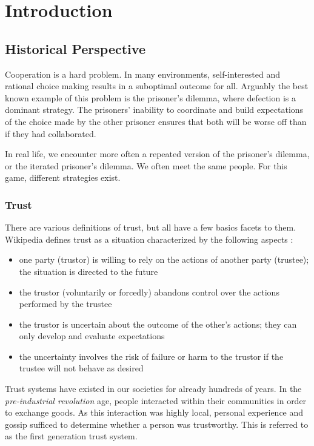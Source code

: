 \chapter{Introduction}
\section{Historical Perspective}
Cooperation is a hard problem. 
In many environments, self-interested and rational choice making results in a suboptimal outcome for all. 
Arguably the best known example of this problem is the prisoner's dilemma, 
where defection is a dominant strategy. 
The prisoners' inability to coordinate and build expectations of the choice made by the other prisoner ensures that both will be worse off than if they had collaborated.

In real life, we encounter more often a repeated version of the prisoner's dilemma, or the iterated prisoner's dilemma. 
We often meet the same people. 
For this game, different strategies exist. 

\subsection{Trust}
There are various definitions of trust, 
but all have a few basics facets to them. 
Wikipedia defines trust as a situation characterized by the following aspects \cite{wikipedia_trust}:
\begin{itemize}
	\item one party (trustor) is willing to rely on the actions of another party (trustee); 
	the situation is directed to the future
	\item the trustor (voluntarily or forcedly) abandons control over the actions performed by the trustee
	\item the trustor is uncertain about the outcome of the other's actions; 
	they can only develop and evaluate expectations
	\item the uncertainty involves the risk of failure or harm to the trustor if the trustee will not behave as desired
\end{itemize}
Trust systems have existed in our societies for already hundreds of years. 
In the \emph{pre-industrial revolution} age, people interacted within their communities in order to exchange goods. 
As this interaction was highly local, personal experience and gossip sufficed to determine whether a person was trustworthy. 
This is referred to as the first generation trust system. 

